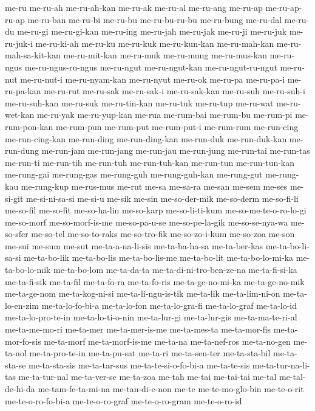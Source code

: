 {me-ru me-ru-ah me-ru-ah-kan me-ru-ak me-ru-al me-ru-ang me-ru-ap
me-ru-ap-ru-ap me-ru-ban me-ru-bi me-ru-bu me-ru-bu-ru-bu me-ru-bung
me-ru-dal me-ru-du me-ru-gi me-ru-gi-kan me-ru-ing me-ru-jah me-ru-jak
me-ru-ji me-ru-juk me-ru-juk-i me-ru-ki-ah me-ru-ku me-ru-kuk
me-ru-kun-kan me-ru-mah-kan me-ru-mah-sa-kit-kan me-ru-mit-kan me-ru-muk
me-ru-mung me-ru-mus-kan me-ru-ngus me-ru-ngus-ru-ngus me-ru-ngut
me-ru-ngut-kan me-ru-ngut-ru-ngut me-ru-nut me-ru-nut-i me-ru-nyam-kan
me-ru-nyut me-ru-ok me-ru-pa me-ru-pa-i me-ru-pa-kan me-ru-rut me-ru-sak
me-ru-sak-i me-ru-sak-kan me-ru-suh me-ru-suh-i me-ru-suh-kan me-ru-suk
me-ru-tin-kan me-ru-tuk me-ru-tup me-ru-wat me-ru-wet-kan me-ru-yak
me-ru-yup-kan me-rua me-rum-bai me-rum-bu me-rum-pi me-rum-pon-kan
me-rum-pun me-rum-put me-rum-put-i me-rum-rum me-run-cing me-run-cing-kan
me-run-ding me-run-ding-kan me-run-duk me-run-duk-kan me-run-dung
me-run-jam me-run-jang me-run-jau me-run-jung me-run-tai me-run-tas
me-run-ti me-run-tih me-run-tuh me-run-tuh-kan me-run-tun me-run-tun-kan
me-rung-gai me-rung-gas me-rung-guh me-rung-guh-kan me-rung-gut
me-rung-kau me-rung-kup me-rus-mus me-rut me-sa me-sa-ra me-san me-sem
me-ses me-si-git me-si-ni-sa-si me-si-u me-sik me-sin me-so-der-mik
me-so-derm me-so-fi-li me-so-fil me-so-fit me-so-ha-lin me-so-karp
me-so-li-ti-kum me-so-me-te-o-ro-lo-gi me-so-morf me-so-morf-is-me
me-so-pa-u-se me-so-pe-la-gik me-so-se-nya-wa me-so-sfer me-so-tel
me-so-to-raks me-so-tro-fik me-so-zo-i-kum me-so-zoa me-son me-sui me-sum
me-sut me-ta-a-na-li-sis me-ta-ba-ha-sa me-ta-ber-kas me-ta-bo-li-sa-si
me-ta-bo-lik me-ta-bo-lis me-ta-bo-lis-me me-ta-bo-lit me-ta-bo-lo-mi-ka
me-ta-bo-lo-mik me-ta-bo-lom me-ta-da-ta me-ta-di-ni-tro-ben-ze-na
me-ta-fi-si-ka me-ta-fi-sik me-ta-fil me-ta-fo-ra me-ta-fo-ris
me-ta-ge-no-mi-ka me-ta-ge-no-mik me-ta-ge-nom me-ta-kog-ni-si
me-ta-li-ngu-is-tik me-ta-lik me-ta-lim-ni-on me-ta-lo-en-zim
me-ta-lo-fo-bi-a me-ta-lo-fon me-ta-lo-gra-fi me-ta-lo-graf me-ta-lo-id
me-ta-lo-pro-te-in me-ta-lo-ti-o-nin me-ta-lur-gi me-ta-lur-gis
me-ta-ma-te-ri-al me-ta-me-mo-ri me-ta-mer me-ta-mer-is-me me-ta-mes-ta
me-ta-mor-fis me-ta-mor-fo-sis me-ta-morf me-ta-morf-is-me me-ta-na
me-ta-nef-ros me-ta-no-gen me-ta-nol me-ta-pro-te-in me-ta-pu-sat me-ta-ri
me-ta-sen-ter me-ta-sta-bil me-ta-sta-se me-ta-sta-sis me-ta-tar-sus
me-ta-te-si-o-fo-bi-a me-ta-te-sis me-ta-tur-na-li-tas me-ta-tur-nal
me-ta-ver-se me-ta-zoa me-tah me-tai me-tai-tai me-tal me-tal-de-hi-da
me-tam-fe-ta-mi-na me-tan-di-e-non me-te me-te-mo-glo-bin me-te-o-rit
me-te-o-ro-fo-bi-a me-te-o-ro-graf me-te-o-ro-gram me-te-o-ro-id
}
